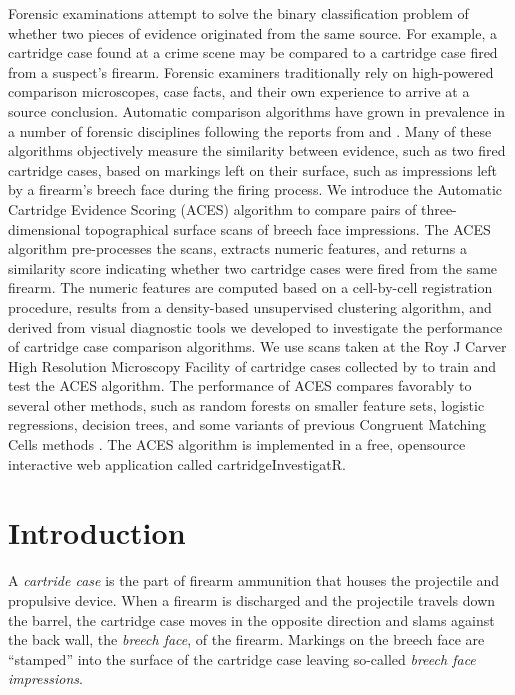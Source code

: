 \documentclass[11pt,]{isuthesis}
\begin{document}
Forensic examinations attempt to solve the binary classification problem of whether two pieces of evidence originated from the same source.
For example, a cartridge case found at a crime scene may be compared to a cartridge case fired from a suspect's firearm.
Forensic examiners traditionally rely on high-powered comparison microscopes, case facts, and their own experience to arrive at a source conclusion.
Automatic comparison algorithms have grown in prevalence in a number of forensic
disciplines following the reports from \citet{council_strengthening_2009} and \citet{pcast2016}.
Many of these algorithms objectively measure the similarity between evidence, such as two fired cartridge cases, based on markings left on their surface, such as impressions left by a firearm's breech face during the firing process.
We introduce the Automatic Cartridge Evidence Scoring (ACES) algorithm to compare pairs of three-dimensional topographical surface scans of breech face impressions.
The ACES algorithm pre-processes the scans, extracts numeric features, and returns a similarity score indicating whether two cartridge cases were fired from the same firearm.
The numeric features are computed based on a cell-by-cell registration procedure, results from a density-based unsupervised clustering algorithm, and derived from visual diagnostic tools we developed to investigate the performance of cartridge case comparison algorithms.
We use scans taken at the Roy J Carver High Resolution Microscopy Facility of cartridge cases collected by \citet{Baldwin2014} to train and test the ACES algorithm.
The performance of ACES compares favorably to several other methods, such as random forests on smaller feature sets, logistic regressions, decision trees, and some variants of previous Congruent Matching Cells methods \citep{song_proposed_2013, zhang_convergence_2021}.
The ACES algorithm is implemented in a free, opensource interactive web application called cartridgeInvestigatR.

\hypertarget{introduction-1}{%
\section{Introduction}\label{introduction-1}}

A \emph{cartride case} is the part of firearm ammunition that houses the projectile and propulsive device.
When a firearm is discharged and the projectile travels down the barrel, the cartridge case moves in the opposite direction and slams against the back wall, the \emph{breech face}, of the firearm.
Markings on the breech face are ``stamped'' into the surface of the cartridge case leaving so-called \emph{breech face impressions}.
\end{document}
